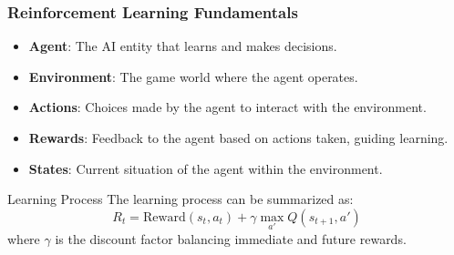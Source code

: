 \documentclass{beamer}
\begin{document}
\begin{frame}
    \frametitle{Reinforcement Learning Fundamentals}
    \begin{itemize}
        \item \textbf{Agent}: The AI entity that learns and makes decisions.
        \item \textbf{Environment}: The game world where the agent operates.
        \item \textbf{Actions}: Choices made by the agent to interact with the environment.
        \item \textbf{Rewards}: Feedback to the agent based on actions taken, guiding learning.
        \item \textbf{States}: Current situation of the agent within the environment.
    \end{itemize}

    \begin{block}{Learning Process}
        The learning process can be summarized as:
        \begin{equation}
        R_t = \text{Reward}(s_t, a_t) + \gamma \max_{a'} Q(s_{t+1}, a')
        \end{equation}
        where $\gamma$ is the discount factor balancing immediate and future rewards.
    \end{block}
\end{frame}
\end{document}
